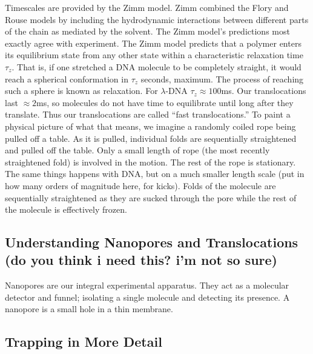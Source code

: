\documentclass[aps,prl,preprint,groupedaddress]{revtex4}
\begin{document}
Timescales are provided by the Zimm model. Zimm combined the Flory and Rouse models by including the hydrodynamic interactions between different parts of the chain as mediated by the solvent. The Zimm model's predictions most exactly agree with experiment. The Zimm model predicts that a polymer enters its equilibrium state from any other state within a characteristic relaxation time \(\tau_z\). That is, if one stretched a DNA molecule to be completely straight, it would reach a spherical conformation in \(\tau_z\) seconds, maximum. The process of reaching such a sphere is known as relaxation. For \(\lambda\)-DNA \(\tau_z \approx 100\)ms. Our translocations last \(\approx 2\)ms, so molecules do not have time to equilibrate until long after they translate. Thus our translocations are called ``fast translocations.'' To paint a physical picture of what that means, we imagine a randomly coiled rope being pulled off a table. As it is pulled, individual folds are sequentially straightened and pulled off the table. Only a small length of rope (the most recently straightened fold) is involved in the motion. The rest of the rope is stationary. The same things happens with DNA, but on a much smaller length scale (put in how many orders of magnitude here, for kicks). Folds of the molecule are sequentially straightened as they are sucked through the pore while the rest of the molecule is effectively frozen.

\subsection{Understanding Nanopores and Translocations (do you think i need this? i'm not so sure)}

Nanopores are our integral experimental apparatus. They act as a molecular detector and funnel; isolating a single molecule and detecting its presence. A nanopore is a small hole in a thin membrane. 

\subsection{Trapping in More Detail}
\end{document}

